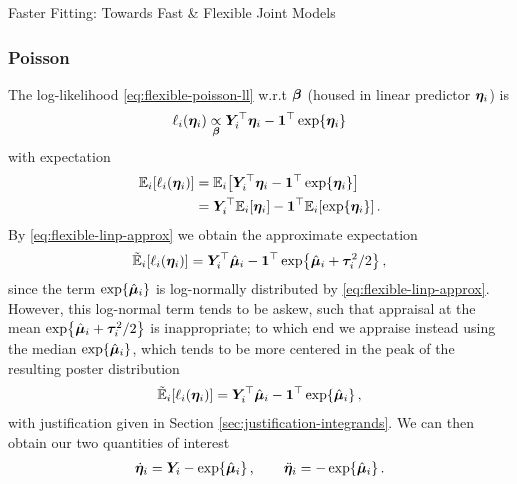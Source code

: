 \begin{chapter}{\label{cha:flexible}Faster Fitting: Towards Fast \& Flexible Joint Models}
\subsubsection{Poisson}
The log-likelihood \eqref{eq:flexible-poisson-ll} w.r.t $\bm{\beta}$ (housed in linear predictor $\bm{\eta}_i$) is
\begin{equation*}
    \ell_i\!\left(\bm{\eta}_i\right)\underset{\bm{\beta}}{\propto}\bm{Y}_i^\top\bm{\eta}_i-\bm{1}^\top\exp\!\left\{\bm{\eta}_i\right\}
\end{equation*}
with expectation
\begin{align*}
    \mathbb{E}_i\!\left[\ell_i\!\left(\bm{\eta}_i\right)\right]&=\mathbb{E}_i\!\left[\bm{Y}_i^\top\bm{\eta}_i-\bm{1}^\top\exp\!\left\{\bm{\eta}_i\right\}\right]\\
    &=\bm{Y}_i^\top\mathbb{E}_i\!\left[\bm{\eta}_i\right]-\bm{1}^\top\mathbb{E}_i\!\left[\exp\!\left\{\bm{\eta}_i\right\}\right].
\end{align*}
By \eqref{eq:flexible-linp-approx} we obtain the approximate expectation
\begin{align*}
    \tilde{\mathbb{E}}_i\!\left[\ell_i\!\left(\bm{\eta}_i\right)\right]=\bm{Y}_i^\top\hat{\bm{\mu}}_i-\bm{1}^\top\exp\!\left\{\hat{\bm{\mu}}_i+\bm{\tau}_i^2/2\right\},
\end{align*}
since the term $\exp\!\left\{\hat{\bm{\mu}}_i\right\}$ is log-normally distributed by \eqref{eq:flexible-linp-approx}. However, this log-normal term tends to be askew, such that appraisal at the mean 
$\exp\!\left\{\hat{\bm{\mu}}_i+\bm{\tau}_i^2/2\right\}$ is inappropriate; to which end we appraise instead using the median $\exp\!\left\{\hat{\bm{\mu}}_i\right\}$, which tends to be more centered in the peak of the resulting poster distribution
\begin{align*}
    \tilde{\mathbb{E}}_i\!\left[\ell_i\!\left(\bm{\eta}_i\right)\right]=\bm{Y}_i^\top\hat{\bm{\mu}}_i-\bm{1}^\top\exp\!\left\{\hat{\bm{\mu}}_i\right\},
\end{align*}
with justification given in Section \ref{sec:justification-integrands}. We can then obtain our two quantities of interest
\begin{align}
    \dot{\bm{\eta}}_i = \bm{Y}_i-\exp\!\left\{\hat{\bm{\mu}}_i\right\},\qquad\ddot{\bm{\eta}}_i=-\exp\!\left\{\hat{\bm{\mu}}_i\right\}.
\label{eq:flexible-Mstep-beta-poisson}
\end{align}


\end{chapter}
